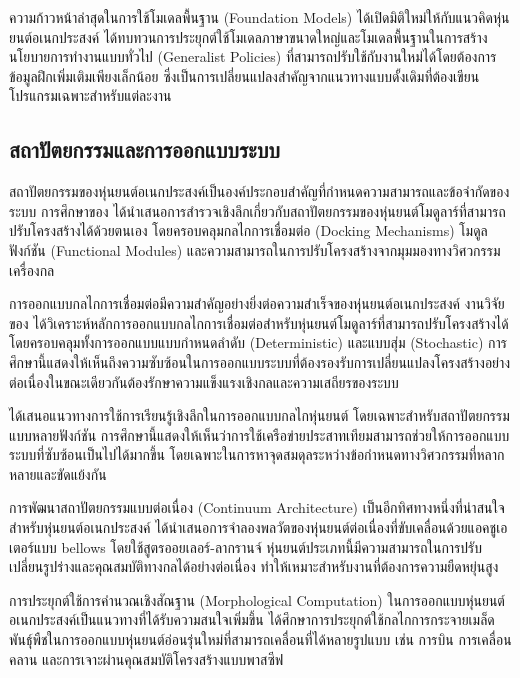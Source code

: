 \documentclass[a4paper]{article}
\begin{document}
ความก้าวหน้าล่าสุดในการใช้โมเดลพื้นฐาน (Foundation Models) ได้เปิดมิติใหม่ให้กับแนวคิดหุ่นยนต์อเนกประสงค์ \textcite{wang2023robot} ได้ทบทวนการประยุกต์ใช้โมเดลภาษาขนาดใหญ่และโมเดลพื้นฐานในการสร้างนโยบายการทำงานแบบทั่วไป (Generalist Policies) ที่สามารถปรับใช้กับงานใหม่ได้โดยต้องการข้อมูลฝึกเพิ่มเติมเพียงเล็กน้อย ซึ่งเป็นการเปลี่ยนแปลงสำคัญจากแนวทางแบบดั้งเดิมที่ต้องเขียนโปรแกรมเฉพาะสำหรับแต่ละงาน

\subsection{สถาปัตยกรรมและการออกแบบระบบ}

สถาปัตยกรรมของหุ่นยนต์อเนกประสงค์เป็นองค์ประกอบสำคัญที่กำหนดความสามารถและข้อจำกัดของระบบ การศึกษาของ \textcite{post2023modular} ได้นำเสนอการสำรวจเชิงลึกเกี่ยวกับสถาปัตยกรรมของหุ่นยนต์โมดูลาร์ที่สามารถปรับโครงสร้างได้ด้วยตนเอง โดยครอบคลุมกลไกการเชื่อมต่อ (Docking Mechanisms) โมดูลฟังก์ชัน (Functional Modules) และความสามารถในการปรับโครงสร้างจากมุมมองทางวิศวกรรมเครื่องกล

การออกแบบกลไกการเชื่อมต่อมีความสำคัญอย่างยิ่งต่อความสำเร็จของหุ่นยนต์อเนกประสงค์ งานวิจัยของ \textcite{liang2025decoding} ได้วิเคราะห์หลักการออกแบบกลไกการเชื่อมต่อสำหรับหุ่นยนต์โมดูลาร์ที่สามารถปรับโครงสร้างได้ โดยครอบคลุมทั้งการออกแบบแบบกำหนดลำดับ (Deterministic) และแบบสุ่ม (Stochastic) การศึกษานี้แสดงให้เห็นถึงความซับซ้อนในการออกแบบระบบที่ต้องรองรับการเปลี่ยนแปลงโครงสร้างอย่างต่อเนื่องในขณะเดียวกันต้องรักษาความแข็งแรงเชิงกลและความเสถียรของระบบ

\textcite{krishnan2023deep} ได้เสนอแนวทางการใช้การเรียนรู้เชิงลึกในการออกแบบกลไกหุ่นยนต์ โดยเฉพาะสำหรับสถาปัตยกรรมแบบหลายฟังก์ชัน การศึกษานี้แสดงให้เห็นว่าการใช้เครือข่ายประสาทเทียมสามารถช่วยให้การออกแบบระบบที่ซับซ้อนเป็นไปได้มากขึ้น โดยเฉพาะในการหาจุดสมดุลระหว่างข้อกำหนดทางวิศวกรรมที่หลากหลายและขัดแย้งกัน

การพัฒนาสถาปัตยกรรมแบบต่อเนื่อง (Continuum Architecture) เป็นอีกทิศทางหนึ่งที่น่าสนใจสำหรับหุ่นยนต์อเนกประสงค์ \textcite{ieee2023dynamic} ได้นำเสนอการจำลองพลวัตของหุ่นยนต์ต่อเนื่องที่ขับเคลื่อนด้วยแอคชูเอเตอร์แบบ bellows โดยใช้สูตรออยเลอร์-ลากรานจ์ หุ่นยนต์ประเภทนี้มีความสามารถในการปรับเปลี่ยนรูปร่างและคุณสมบัติทางกลได้อย่างต่อเนื่อง ทำให้เหมาะสำหรับงานที่ต้องการความยืดหยุ่นสูง

การประยุกต์ใช้การคำนวณเชิงสัณฐาน (Morphological Computation) ในการออกแบบหุ่นยนต์อเนกประสงค์เป็นแนวทางที่ได้รับความสนใจเพิ่มขึ้น \textcite{sitti2021morphological} ได้ศึกษาการประยุกต์ใช้กลไกการกระจายเมล็ดพันธุ์พืชในการออกแบบหุ่นยนต์อ่อนรุ่นใหม่ที่สามารถเคลื่อนที่ได้หลายรูปแบบ เช่น การบิน การเคลื่อนคลาน และการเจาะผ่านคุณสมบัติโครงสร้างแบบพาสซีฟ
\end{document}
